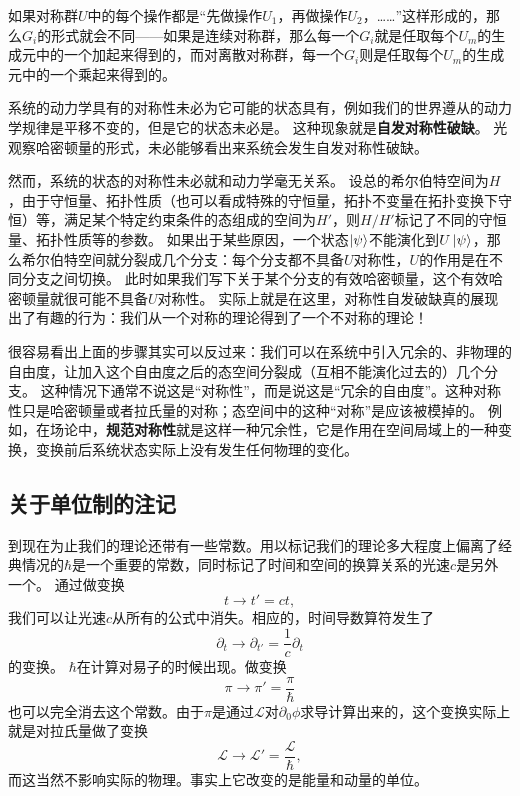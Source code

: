 \documentclass[UTF8, a4paper]{ctexart}
\begin{document}
如果对称群$U$中的每个操作都是“先做操作$U_1$，再做操作$U_2$，……”这样形成的，那么$G_i$的形式就会不同——如果是连续对称群，那么每一个$G_i$就是任取每个$U_m$的生成元中的一个加起来得到的，而对离散对称群，每一个$G_i$则是任取每个$U_m$的生成元中的一个乘起来得到的。

系统的动力学具有的对称性未必为它可能的状态具有，例如我们的世界遵从的动力学规律是平移不变的，但是它的状态未必是。
这种现象就是\textbf{自发对称性破缺}。
光观察哈密顿量的形式，未必能够看出来系统会发生自发对称性破缺。

然而，系统的状态的对称性未必就和动力学毫无关系。
设总的希尔伯特空间为$H$，由于守恒量、拓扑性质（也可以看成特殊的守恒量，拓扑不变量在拓扑变换下守恒）等，满足某个特定约束条件的态组成的空间为$H'$，则$H / H'$标记了不同的守恒量、拓扑性质等的参数。
如果出于某些原因，一个状态$\ket{\psi}$不能演化到$U \ket{\psi}$，那么希尔伯特空间就分裂成几个分支：每个分支都不具备$U$对称性，$U$的作用是在不同分支之间切换。
此时如果我们写下关于某个分支的有效哈密顿量，这个有效哈密顿量就很可能不具备$U$对称性。
实际上就是在这里，对称性自发破缺真的展现出了有趣的行为：我们从一个对称的理论得到了一个不对称的理论！

很容易看出上面的步骤其实可以反过来：我们可以在系统中引入冗余的、非物理的自由度，让加入这个自由度之后的态空间分裂成（互相不能演化过去的）几个分支。
这种情况下通常不说这是“对称性”，而是说这是“冗余的自由度”。这种对称性只是哈密顿量或者拉氏量的对称；态空间中的这种“对称”是应该被模掉的。
例如，在场论中，\textbf{规范对称性}就是这样一种冗余性，它是作用在空间局域上的一种变换，变换前后系统状态实际上没有发生任何物理的变化。

\subsection{关于单位制的注记}

到现在为止我们的理论还带有一些常数。用以标记我们的理论多大程度上偏离了经典情况的$\hbar$是一个重要的常数，同时标记了时间和空间的换算关系的光速$c$是另外一个。
通过做变换
\[
    t \longrightarrow t' = ct,
\]
我们可以让光速$c$从所有的公式中消失。相应的，时间导数算符发生了
\[
    \partial_t \longrightarrow \partial_{t'} = \frac{1}{c} \partial_t
\]
的变换。
$\hbar$在计算对易子的时候出现。做变换
\[
    \pi \longrightarrow \pi' = \frac{\pi}{\hbar}
\]
也可以完全消去这个常数。由于$\pi$是通过$\mathcal{L}$对$\partial_0 \phi$求导计算出来的，这个变换实际上就是对拉氏量做了变换
\[
    \mathcal{L} \longrightarrow \mathcal{L}' = \frac{\mathcal{L}}{\hbar},
\]
而这当然不影响实际的物理。事实上它改变的是能量和动量的单位。
\end{document}
